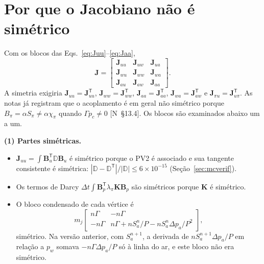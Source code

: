 \documentclass[11pt,a4paper]{article}
\numberwithin{equation}{section}
\newcommand{\pabs}{P}
\newcommand{\nota}[1]{{\footnotesize\textsf{[N~#1]}}}
\begin{document}
\section{Por que o Jacobiano não é simétrico}\label{sec:simetria}

Com os blocos das Eqs.~\eqref{eq:Juu}--\eqref{eq:Jaa},
\begin{equation}
\mathbf J=\begin{bmatrix}\mathbf J_{uu}&\mathbf J_{uw}&\mathbf J_{ua}\\ \mathbf J_{wu}&\mathbf J_{ww}&\mathbf J_{wa}\\
\mathbf J_{au}&\mathbf J_{aw}&\mathbf J_{aa}\end{bmatrix}.
\label{eq:Jblocos}
\end{equation}
A simetria exigiria $\mathbf J_{uu}=\mathbf J_{uu}^{\mathsf T}$, $\mathbf J_{ww}=\mathbf J_{ww}^{\mathsf T}$,
$\mathbf J_{aa}=\mathbf J_{aa}^{\mathsf T}$, $\mathbf J_{wa}=\mathbf J_{aw}^{\mathsf T}$ e $\mathbf J_{\pi u}=\mathbf J_{u\pi}^{\mathsf T}$.
As notas já registram que o acoplamento é em geral não simétrico porque $B_\pi=\alpha S_\pi\neq\alpha\chi_\pi$ quando
$\Gamma p_c\neq0$ \nota{§13.4}. Os blocos são examinados abaixo um a um.

\textbf{(1) Partes simétricas.}
\begin{itemize}
\item $\mathbf J_{uu}=\int\mathbf B_u^{\mathsf T}\mathbb D\mathbf B_u$ é simétrico porque o PV2 é associado e sua tangente
consistente é simétrica: $|\mathbb D-\mathbb D^{\mathsf T}|/|\mathbb D|\le6\times10^{-15}$ (Seção~\ref{sec:mcverif}).
\item Os termos de Darcy $\Delta t\int\mathbf B_p^{\mathsf T}\lambda_\pi\mathbf K\mathbf B_p$ são simétricos porque $\mathbf K$ é
simétrico.
\item O bloco condensado de cada vértice é
\begin{equation}
m_j\begin{bmatrix}n\Gamma&-n\Gamma\\-n\Gamma&n\Gamma+nS_a^n/\pabs-nS_a^n\Delta p_a/\pabs^2\end{bmatrix},
\label{eq:Jcond}
\end{equation}
simétrico. Na versão anterior, com $S_a^{n+1}$, a derivada de $nS_a^{n+1}\Delta p_a/\pabs$ em relação a $p_w$ somava
$-n\Gamma\Delta p_a/\pabs$ só à linha do ar, e este bloco não era simétrico.
\end{itemize}
\end{document}
